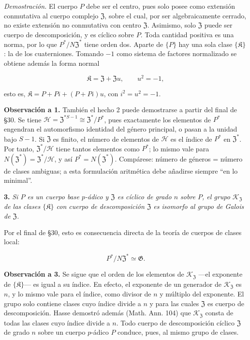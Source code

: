 \noindent\emph{Demostración.} El cuerpo $P$ debe ser el centro, pues solo posee como extensión conmutativa al cuerpo complejo $\mathfrak Z$, sobre el cual, por ser algebraicamente cerrado, no existe extensión no conmutativa con centro $\mathfrak Z$. Asimismo, solo $\mathfrak Z$ puede ser cuerpo de descomposición, y es cíclico sobre $P$. Toda cantidad positiva es una norma, por lo que $P^*/N\mathfrak Z^*$ tiene orden dos. Aparte de $\{P\}$ hay una sola clase $\{\mathfrak K\}$: la de los cuaterniones. Tomando $-1$ como sistema de factores normalizado se obtiene además la forma normal

\[
\mathfrak K=\mathfrak Z+\mathfrak Zu,\qquad u^2=-1,
\]

esto es, $\mathfrak K=P+Pi+(P+Pi)u$, con $i^2=u^2=-1$.

\noindent\textbf{Observación a 1.} También el hecho 2 puede demostrarse a partir del final de §30. Se tiene $\mathscr H=\mathfrak Z^{*S-1}\cong\mathfrak Z^*/P^*$, pues exactamente los elementos de $P^*$ engendran el automorfismo identidad del género principal, o pasan a la unidad bajo $S-1$. Si $\mathfrak Z$ es finito, el número de elementos de $\mathscr H$ es el índice de $P^*$ en $\mathfrak Z^*$. Por tanto, $\mathfrak Z^*/\mathscr H$ tiene tantos elementos como $P^*$; lo mismo vale para $N(\mathfrak Z^*)=\mathfrak Z^*/\mathscr H$, y así $P^*=N(\mathfrak Z^*)$. Compárese: número de géneros = número de clases ambiguas; a esta formulación aritmética debe añadirse siempre ``en lo minimal''.

\noindent\textbf{3.} \emph{Si $P$ es un cuerpo base $p$-ádico y $\mathfrak Z$ es cíclico de grado $n$ sobre $P$, el grupo $\mathscr K_{\mathfrak Z}$ de las clases $\{\mathfrak K\}$ con cuerpo de descomposición $\mathfrak Z$ es isomorfo al grupo de Galois de $\mathfrak Z$.}

Por el final de §30, esto es consecuencia directa de la teoría de cuerpos de clases local:

\[
P^*/N\mathfrak Z^*\simeq\mathfrak G.
\]

\noindent\textbf{Observación a 3.} Se sigue que el orden de los elementos de $\mathscr K_{\mathfrak Z}$ ---el exponente de $\{\mathfrak K\}$--- es igual a su índice. En efecto, el exponente de un generador de $\mathscr K_{\mathfrak Z}$ es $n$, y lo mismo vale para el índice, como divisor de $n$ y múltiplo del exponente. El grupo solo contiene clases cuyo índice divide a $n$ y para las cuales $\mathfrak Z$ es cuerpo de descomposición. Hasse demostró además (Math. Ann. 104) que $\mathscr K_{\mathfrak Z}$ consta de todas las clases cuyo índice divide a $n$. Todo cuerpo de descomposición cíclico $\mathfrak Z$ de grado $n$ sobre un cuerpo $p$-ádico $P$ conduce, pues, al mismo grupo de clases.

